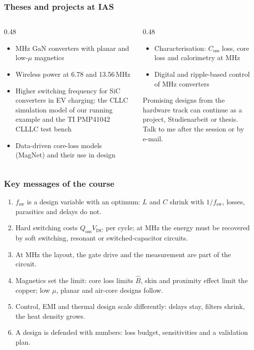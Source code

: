 \begin{frame}
	\frametitle{Theses and projects at IAS}
	\begin{columns}[T]
		\begin{column}{0.48\textwidth}
			\small
			\begin{itemize}
				\item MHz GaN converters with planar and low-$\mu$ magnetics
				\item Wireless power at 6.78 and 13.56\,MHz
				\item Higher switching frequency for SiC converters in EV charging: the CLLC simulation model of our running example and the TI PMP41042 CLLLC test bench
				\item Data-driven core-loss models (MagNet) and their use in design
			\end{itemize}
		\end{column}
		\begin{column}{0.48\textwidth}
			\small
			\begin{itemize}
				\item Characterisation: $C_\mathrm{oss}$ loss, core loss and calorimetry at MHz
				\item Digital and ripple-based control of MHz converters
			\end{itemize}
			Promising designs from the hardware track can continue as a project, Studienarbeit or thesis. Talk to me after the session or by e-mail.
		\end{column}
	\end{columns}
\end{frame}

\begin{frame}
	\frametitle{Key messages of the course}
	\begin{enumerate}
		\item $f_\mathrm{sw}$ is a design variable with an optimum: $L$ and $C$ shrink with $1/f_\mathrm{sw}$, losses, parasitics and delays do not.
		\item Hard switching costs $Q_\mathrm{oss}V_\mathrm{DC}$ per cycle; at MHz the energy must be recovered by soft switching, resonant or switched-capacitor circuits.
		\item At MHz the layout, the gate drive and the measurement are part of the circuit.
		\item Magnetics set the limit: core loss limits $\hat{B}$, skin and proximity effect limit the copper; low $\mu$, planar and air-core designs follow.
		\item Control, EMI and thermal design scale differently: delays stay, filters shrink, the heat density grows.
		\item A design is defended with numbers: loss budget, sensitivities and a validation plan.
	\end{enumerate}
\end{frame}

